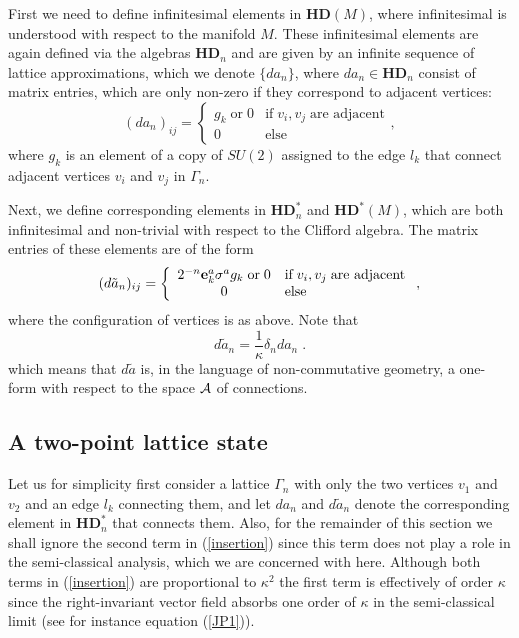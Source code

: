 \documentclass[12pt]{article}
\newcommand{\nn}{\nonumber}
\def\d{\delta}
\def\G{\Gamma}
\def\ca{{\cal A}}
\begin{document}
First we need to define infinitesimal elements in $\mathbf{HD}(M)$, where infinitesimal is understood with respect to the manifold $M$. These infinitesimal elements are again defined via the algebras $\mathbf{HD}_n$ and are given by an infinite sequence of lattice approximations, which we denote $\{da_n\}$, where $da_n\in\mathbf{HD}_n$ consist of matrix entries, which are only non-zero if they correspond to adjacent vertices:
\begin{equation}
(da_n)_{ij} = \left\{
\begin{array}{cl}
g_k\;\mbox{or}\; 0 & \mbox{if}\; v_i, v_j \;\mbox{are adjacent}\\
0     & \mbox{else}
\end{array}
\right.,\nn
\end{equation}
where $g_k$ is an element of a copy of $SU(2)$ assigned to the edge $l_k$ that connect adjacent vertices $v_i$ and $v_j$ in $\G_n$. %

Next, we define corresponding elements in $\mathbf{HD}^*_n$ and $\mathbf{HD}^*(M)$, which are both infinitesimal and non-trivial with respect to the Clifford algebra. The matrix entries  of these elements are of the form
\begin{equation}
(d\tilde{a}_n)_{ij}  = \left\{
\begin{array}{cl}
2^{-n}{\bf e}^a_k  \sigma^a g_k \;\mbox{or}\; 0&\mbox{if}\; v_i, v_j \;\mbox{are adjacent}\\
0     & \mbox{else}
\end{array}
\right.,
\label{MWind}
\end{equation}
where the configuration of vertices is as above. Note that 
$$ 
d\tilde{a}_n =  \frac{1}{\kappa}  \d_n d a_n\;.
$$
which means that $d\tilde{a}	$ is, in the language of non-commutative geometry, a one-form with respect to the space $\ca$ of connections.



\subsection{A two-point lattice state}


Let us for simplicity first consider a lattice $\G_n$ with only the two vertices $v_1$ and $v_2$ and an edge $l_k$ connecting them, and let $da_n$ and $d\tilde{a}_n$ denote the corresponding element in $\mathbf{HD}^*_n$ that connects them. Also, for the remainder of this section we shall ignore the second term in (\ref{insertion}) since this term does not play a role in the semi-classical analysis, which we are concerned with here. Although both terms in (\ref{insertion}) are proportional to $\kappa^2$ the first term is effectively of order $\kappa$ since the right-invariant vector field absorbs one order of $\kappa$ in the semi-classical limit (see for instance equation (\ref{JP1})).
\end{document}
